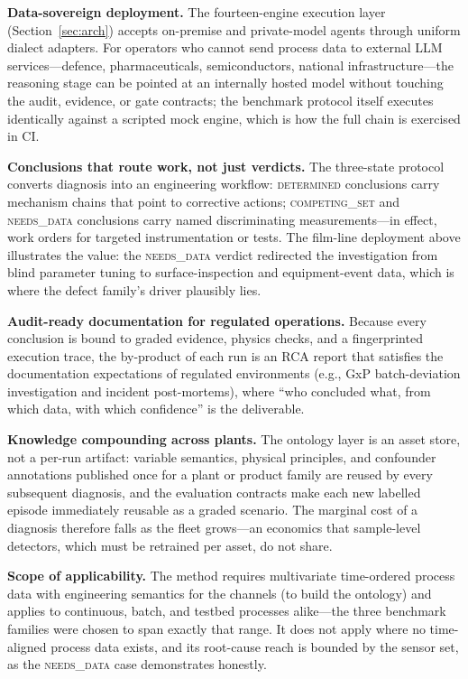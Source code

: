 \documentclass[journal]{IEEEtran}
\begin{document}
\textbf{Data-sovereign deployment.} The fourteen-engine execution layer (Section~\ref{sec:arch}) accepts on-premise and private-model agents through uniform dialect adapters. For operators who cannot send process data to external LLM services---defence, pharmaceuticals, semiconductors, national infrastructure---the reasoning stage can be pointed at an internally hosted model without touching the audit, evidence, or gate contracts; the benchmark protocol itself executes identically against a scripted mock engine, which is how the full chain is exercised in CI.

\textbf{Conclusions that route work, not just verdicts.} The three-state protocol converts diagnosis into an engineering workflow: \textsc{determined} conclusions carry mechanism chains that point to corrective actions; \textsc{competing\_set} and \textsc{needs\_data} conclusions carry named discriminating measurements---in effect, work orders for targeted instrumentation or tests. The film-line deployment above illustrates the value: the \textsc{needs\_data} verdict redirected the investigation from blind parameter tuning to surface-inspection and equipment-event data, which is where the defect family's driver plausibly lies.

\textbf{Audit-ready documentation for regulated operations.} Because every conclusion is bound to graded evidence, physics checks, and a fingerprinted execution trace, the by-product of each run is an RCA report that satisfies the documentation expectations of regulated environments (e.g., GxP batch-deviation investigation and incident post-mortems), where ``who concluded what, from which data, with which confidence'' is the deliverable.

\textbf{Knowledge compounding across plants.} The ontology layer is an asset store, not a per-run artifact: variable semantics, physical principles, and confounder annotations published once for a plant or product family are reused by every subsequent diagnosis, and the evaluation contracts make each new labelled episode immediately reusable as a graded scenario. The marginal cost of a diagnosis therefore falls as the fleet grows---an economics that sample-level detectors, which must be retrained per asset, do not share.

\textbf{Scope of applicability.} The method requires multivariate time-ordered process data with engineering semantics for the channels (to build the ontology) and applies to continuous, batch, and testbed processes alike---the three benchmark families were chosen to span exactly that range. It does not apply where no time-aligned process data exists, and its root-cause reach is bounded by the sensor set, as the \textsc{needs\_data} case demonstrates honestly.
\end{document}
